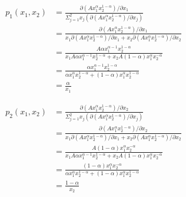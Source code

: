 \documentclass{article}
\begin{document}
\begin{align*}
p_1(x_1,x_2) &=  \frac{\partial (Ax_1^{\alpha}x_2^{1-\alpha}) / \partial x_1}{\Sigma^{2}_{j=1} x_j( \partial (Ax_1^{\alpha}x_2^{1-\alpha}) / \partial x_j)} \\
&=\frac{\partial (Ax_1^{\alpha}x_2^{1-\alpha}) / \partial x_1}{x_1 \partial (Ax_1^{\alpha}x_2^{1-\alpha}) / \partial x_1 + x_2  \partial (Ax_1^{\alpha}x_2^{1-\alpha}) / \partial x_2} \\
&=\frac{A\alpha x_1^{\alpha -1}x_2^{1-\alpha}}{x_1 A\alpha x_1^{\alpha -1}x_2^{1-\alpha} + x_2A(1-\alpha) x_1^{\alpha}x_2^{-\alpha}} \\
&=\frac{\alpha x_1^{\alpha -1}x_2^{1-\alpha}}{\alpha x_1^{\alpha}x_2^{1-\alpha} + (1-\alpha) x_1^{\alpha}x_2^{1-\alpha}} \\
&=\frac{\alpha}{x_1}
\end{align*}

\begin{align*}
p_2(x_1,x_2) &=  \frac{\partial (Ax_1^{\alpha}x_2^{1-\alpha}) / \partial x_2}{\Sigma^{2}_{j=1} x_j( \partial (Ax_1^{\alpha}x_2^{1-\alpha}) / \partial x_j)} \\
&=\frac{\partial (Ax_1^{\alpha}x_2^{1-\alpha}) / \partial x_2}{x_1 \partial (Ax_1^{\alpha}x_2^{1-\alpha}) / \partial x_1 + x_2  \partial (Ax_1^{\alpha}x_2^{1-\alpha}) / \partial x_2} \\
&=\frac{A(1-\alpha) x_1^{\alpha}x_2^{-\alpha}}{x_1 A\alpha x_1^{\alpha -1}x_2^{1-\alpha} + x_2A(1-\alpha) x_1^{\alpha}x_2^{-\alpha}} \\
&=\frac{(1-\alpha) x_1^{\alpha}x_2^{-\alpha}}{\alpha x_1^{\alpha}x_2^{1-\alpha} + (1-\alpha) x_1^{\alpha}x_2^{1-\alpha}} \\
&=\frac{1-\alpha}{x_2}
\end{align*}
\end{document}
